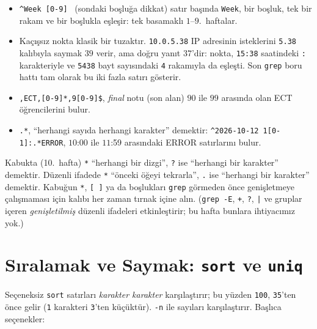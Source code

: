 \documentclass[11pt,a4paper]{article}
\newcommand{\cmd}[1]{\texttt{#1}}
\begin{document}
\begin{itemize}
  \item \texttt{\textasciicircum Week [0-9] } (sondaki boşluğa dikkat) satır başında \texttt{Week}, bir boşluk, tek bir rakam ve bir boşlukla eşleşir: tek basamaklı $1$--$9$.~haftalar.
  \item Kaçışsız nokta klasik bir tuzaktır. \texttt{10.0.5.38} IP adresinin isteklerini \texttt{5.38} kalıbıyla saymak $39$ verir, ama doğru yanıt $37$'dir: nokta, \texttt{15:38} saatindeki \texttt{:} karakteriyle ve \texttt{5438} bayt sayısındaki \texttt{4} rakamıyla da eşleşti. Son \cmd{grep} boru hattı tam olarak bu iki fazla satırı gösterir.
  \item \texttt{,ECT,[0-9]*,9[0-9]\$}, \emph{final} notu (son alan) $90$ ile $99$ arasında olan ECT öğrencilerini bulur.
  \item \texttt{.*}, ``herhangi sayıda herhangi karakter'' demektir: \texttt{\textasciicircum 2026-10-12 1[0-1]:.*ERROR}, $10$:00 ile $11$:59 arasındaki ERROR satırlarını bulur.
\end{itemize}

\begin{keyidea}
Kabukta (10.~hafta) \texttt{*} ``herhangi bir dizgi'', \texttt{?} ise ``herhangi bir karakter'' demektir. Düzenli ifadede \texttt{*} ``önceki öğeyi tekrarla'', \texttt{.} ise ``herhangi bir karakter'' demektir. Kabuğun \texttt{*}, \texttt{[ ]} ya da boşlukları \cmd{grep} görmeden önce genişletmeye çalışmaması için kalıbı her zaman tırnak içine alın. (\cmd{grep -E}, \texttt{+}, \texttt{?}, \texttt{|} ve gruplar içeren \emph{genişletilmiş} düzenli ifadeleri etkinleştirir; bu hafta bunlara ihtiyacımız yok.)
\end{keyidea}

\section{Sıralamak ve Saymak: \texttt{sort} ve \texttt{uniq}}
\label{sec:sort}



Seçeneksiz \cmd{sort} satırları \emph{karakter karakter} karşılaştırır; bu yüzden \texttt{100}, \texttt{35}'ten önce gelir (\texttt{1} karakteri \texttt{3}'ten küçüktür). \cmd{-n} ile sayıları karşılaştırır. Başlıca seçenekler:
\end{document}
